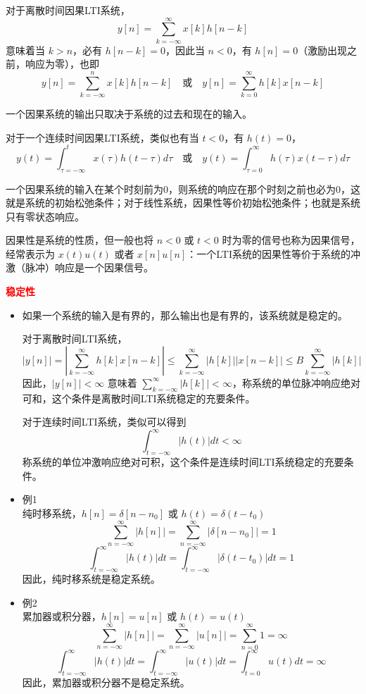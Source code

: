 \documentclass[UTF8]{report}
\theoremstyle{MyLineTheoremStyle} %
\theoremstyle{MyBlockTheoremStyle} %
\theoremstyle{MySubsubsectionStyle} %
\begin{document}
    对于离散时间因果LTI系统，
    \[
    y[n] = \sum_{k=-\infty}^{\infty} x[k] h[n - k]
    \]
    意味着当 $k > n$，必有 $h[n - k] = 0$，因此当 $n < 0$，有 $h[n] = 0$（激励出现之前，响应为零），也即
    \[
    y[n] = \sum_{k=-\infty}^{n} x[k] h[n - k] \quad \text{或} \quad y[n] = \sum_{k=0}^{\infty} h[k] x[n - k]
    \]
    
    一个因果系统的输出只取决于系统的过去和现在的输入。
    
    对于一个连续时间因果LTI系统，类似也有当 $t < 0$，有 $h(t) = 0$，
    \[
    y(t) = \int_{\tau = -\infty}^{t} x(\tau) h(t - \tau) d\tau \quad \text{或} \quad y(t) = \int_{\tau = 0}^{\infty} h(\tau) x(t - \tau) d\tau
    \]
    
    一个因果系统的输入在某个时刻前为0，则系统的响应在那个时刻之前也必为0，这就是系统的初始松弛条件；对于线性系统，因果性等价初始松弛条件；也就是系统只有零状态响应。
    
    因果性是系统的性质，但一般也将 $n < 0$ 或 $t < 0$ 时为零的信号也称为因果信号，经常表示为 $x(t)u(t)$ 或者 $x[n]u[n]$：一个LTI系统的因果性等价于系统的冲激（脉冲）响应是一个因果信号。\par
\vspace{1em}
\raggedright
    \textbf{\textcolor{red}{稳定性}}
    \begin{itemize}

    \item 如果一个系统的输入是有界的，那么输出也是有界的，该系统就是稳定的。
    
    对于离散时间LTI系统，
    \[
    |y[n]| = |\sum_{k=-\infty}^{\infty} h[k] x[n - k]| \leq \sum_{k=-\infty}^{\infty} |h[k]| |x[n - k]| \leq B \sum_{k=-\infty}^{\infty} |h[k]|
    \]
    因此，$|y[n]| < \infty$ 意味着 $\sum_{k=-\infty}^{\infty} |h[k]| < \infty$，称系统的单位脉冲响应绝对可和，这个条件是离散时间LTI系统稳定的充要条件。
    
    对于连续时间LTI系统，类似可以得到
    \[
    \int_{t = -\infty}^{\infty} |h(t)| dt < \infty
    \]
    称系统的单位冲激响应绝对可积，这个条件是连续时间LTI系统稳定的充要条件。
 
        \item 例1\\
    纯时移系统，$h[n] = \delta[n - n_0]$ 或 $h(t) = \delta(t - t_0)$
    \[
    \sum_{n=-\infty}^{\infty} |h[n]| = \sum_{n=-\infty}^{\infty} |\delta[n - n_0]| = 1
    \]
    \[
    \int_{t = -\infty}^{\infty} |h(t)| dt = \int_{t = -\infty}^{\infty} |\delta(t - t_0)| dt = 1
    \]
    因此，纯时移系统是稳定系统。
    
    \item 例2\\
    累加器或积分器，$h[n] = u[n]$ 或 $h(t) = u(t)$
    \[
    \sum_{n=-\infty}^{\infty} |h[n]| = \sum_{n=-\infty}^{\infty} |u[n]| = \sum_{n=0}^{\infty} 1 = \infty
    \]
    \[
    \int_{t = -\infty}^{\infty} |h(t)| dt = \int_{t = -\infty}^{\infty} |u(t)| dt = \int_{t = 0}^{\infty} u(t) dt = \infty
    \]
    因此，累加器或积分器不是稳定系统。
    \end{itemize}
\end{document}
